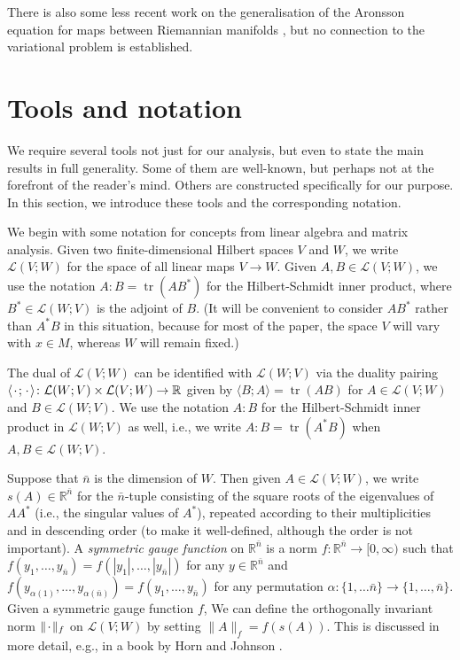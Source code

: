 \documentclass[a4paper]{article}
\newcommand{\R}{\mathbb{R}}
\newcommand{\ndim}{{\bar{n}}}
\newcommand{\Lin}{\mathcal{L}}
\DeclareMathOperator{\tr}{tr}
\newcommand{\blank}{{\mkern 2mu\cdot\mkern 2mu}}
\newcommand{\pairing}[2]{\langle #1; #2 \rangle}
\theoremstyle{definition}
\theoremstyle{remark}
\begin{document}
There is also some less recent work on the generalisation of the Aronsson equation for
maps between Riemannian manifolds \cite{Troutman:08, Wang-Ou:09, Ou-Troutman-Wilhelm:12}, but no
connection to the variational problem is established.











\section{Tools and notation} \label{sct:tools}

We require several tools not just for our analysis, but even to state the
main results in full generality. Some of them are well-known, but perhaps not
at the forefront of the reader's mind. Others are constructed specifically
for our purpose.
In this section, we introduce these tools and the corresponding notation.

We begin with some notation for concepts from linear algebra and matrix analysis.
Given two finite-dimensional Hilbert spaces
$V$ and $W$, we write $\Lin(V; W)$ for the space of all linear maps $V \to W$.
Given $A, B \in \Lin(V; W)$, we use the notation $A : B = \tr (A B^*)$ for the Hilbert-Schmidt inner product, where $B^* \in \Lin(W; V)$ is the adjoint of $B$.
(It will be convenient to consider $AB^*$ rather than $A^*B$ in this
situation, because for most of the paper,
the space $V$ will vary with $x \in M$, whereas $W$ will remain fixed.)

The dual of $\Lin(V; W)$ can be identified with $\Lin(W; V)$ via the
duality pairing
$\pairing{\blank}{\blank} \colon \Lin(W; V) \times \Lin(V; W) \to \R$ given by 
$\pairing{B}{A} = \tr(AB)$ for $A \in \Lin(V; W)$ and $B \in \Lin(W; V)$.
We use the notation $A : B$ for the Hilbert-Schmidt inner product in
$\Lin(W; V)$ as well, i.e., we write $A : B = \tr(A^* B)$ when $A, B \in \Lin(W; V)$.

Suppose that $\ndim$ is the dimension of $W$. Then given $A \in \Lin(V; W)$,
we write $s(A) \in \R^\ndim$ for the $\ndim$-tuple
consisting of the square roots of the eigenvalues of $A A^*$ (i.e., the singular values of $A^*$), repeated according to their multiplicities
and in descending order (to make it well-defined, although the order is not important).
A \emph{symmetric gauge function} on $\R^\ndim$ is a norm
$f \colon \R^\ndim \to [0, \infty)$ such that $f(y_1, \dotsc, y_\ndim) = f(|y_1|, \dotsc, |y_\ndim|)$
for any $y \in \R^\ndim$ and $f(y_{\alpha(1)}, \dotsc, y_{\alpha(\ndim)}) = f(y_1, \dotsc, y_\ndim)$
for any permutation $\alpha \colon \{1, \dotsc \ndim\} \to \{1, \dotsc, \ndim\}$. Given a symmetric gauge function $f$,
We can define the orthogonally invariant norm $\|\blank\|_f$ on $\Lin(V; W)$ by setting $\|A\|_f = f(s(A))$.
This is discussed in more detail, e.g., in a book by Horn and Johnson \cite{Horn-Johnson:85}.
\end{document}
